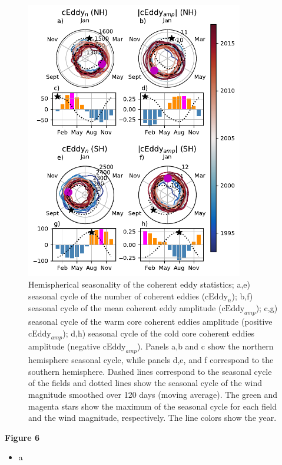 \documentclass[draft,linenumbers]{agujournal2019}
\newcommand{\cEddy}{\textrm{cEddy}}
\begin{document}
	\begin{figure}
	    \centering
	    \includegraphics[width=95mm]{figures/All_polar_plots_eddy_stats_polarity_V3.pdf}
	    \caption{Hemispherical seasonality of the coherent eddy statistics;
		a,e) seasonal cycle of the number of coherent eddies ($\cEddy_n$); b,f) seasonal cycle of the mean coherent eddy amplitude ($\cEddy_{amp}$); c,g) seasonal cycle of the warm core coherent eddies amplitude (positive $\cEddy_{amp}$); d,h) seasonal cycle of the cold core coherent eddies amplitude (negative $\cEddy_{amp}$). Panels a,b and c show the northern hemisphere seasonal cycle, while panels d,e, and f correspond to the southern hemisphere. Dashed lines correspond to the seasonal cycle of the fields and dotted lines show the seasonal cycle of the wind magnitude smoothed over 120 days (moving average). The green and magenta stars show the maximum of the seasonal cycle for each field and the wind magnitude, respectively. The line colors show the year.}
	    \label{fig:eddy_stats_polar}
	\end{figure}

	\textbf{Figure 6}
	\begin{itemize}
		\item a
	\end{itemize}
\end{document}
